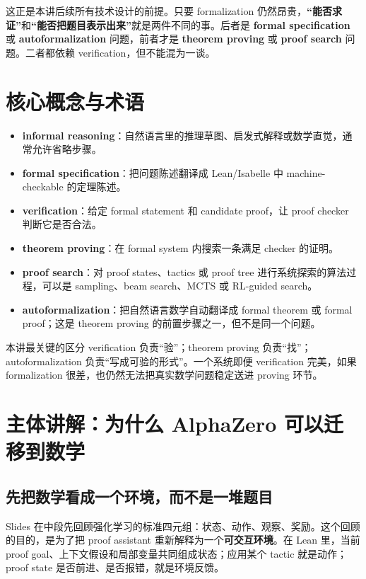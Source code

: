 这正是本讲后续所有技术设计的前提。只要 formalization 仍然昂贵，\textbf{“能否求证”}和\textbf{“能否把题目表示出来”}就是两件不同的事。后者是 \textbf{formal specification} 或 \textbf{autoformalization} 问题，前者才是 \textbf{theorem proving} 或 \textbf{proof search} 问题。二者都依赖 verification，但不能混为一谈。

\section{核心概念与术语}

\begin{itemize}
\item \textbf{informal reasoning}：自然语言里的推理草图、启发式解释或数学直觉，通常允许省略步骤。
\item \textbf{formal specification}：把问题陈述翻译成 Lean/Isabelle 中 machine-checkable 的定理陈述。
\item \textbf{verification}：给定 formal statement 和 candidate proof，让 proof checker 判断它是否合法。
\item \textbf{theorem proving}：在 formal system 内搜索一条满足 checker 的证明。
\item \textbf{proof search}：对 proof states、tactics 或 proof tree 进行系统探索的算法过程，可以是 sampling、beam search、MCTS 或 RL-guided search。
\item \textbf{autoformalization}：把自然语言数学自动翻译成 formal theorem 或 formal proof；这是 theorem proving 的前置步骤之一，但不是同一个问题。
\end{itemize}

\begin{knowledgebox}{本讲最关键的区分}
verification 负责“验”；theorem proving 负责“找”；autoformalization 负责“写成可验的形式”。一个系统即便 verification 完美，如果 formalization 很差，也仍然无法把真实数学问题稳定送进 proving 环节。
\end{knowledgebox}

\section{主体讲解：为什么 AlphaZero 可以迁移到数学}

\subsection{先把数学看成一个环境，而不是一堆题目}

Slides 在中段先回顾强化学习的标准四元组：状态、动作、观察、奖励。这个回顾的目的，是为了把 proof assistant 重新解释为一个\textbf{可交互环境}。在 Lean 里，当前 proof goal、上下文假设和局部变量共同组成状态；应用某个 tactic 就是动作；proof state 是否前进、是否报错，就是环境反馈。


